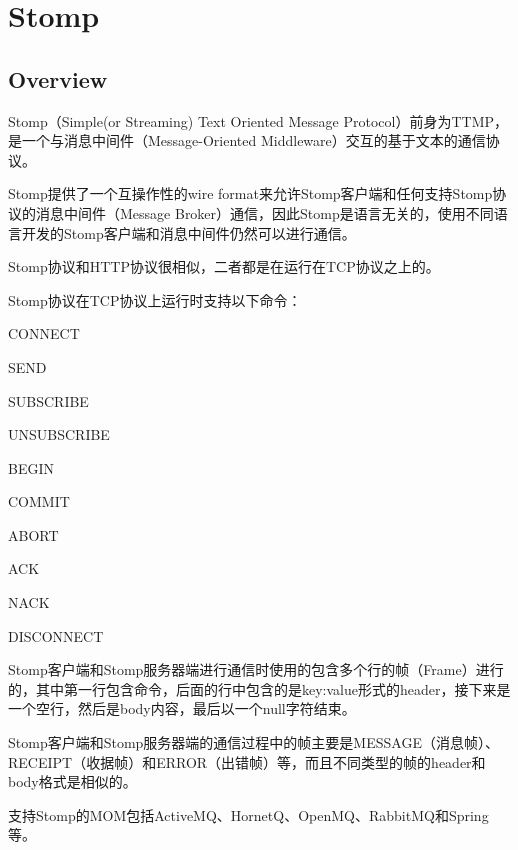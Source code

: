 \part{Stomp}


\chapter{Overview}

Stomp（Simple(or Streaming) Text Oriented Message Protocol）前身为TTMP，是一个与消息中间件（Message-Oriented Middleware）交互的基于文本的通信协议。

Stomp提供了一个互操作性的wire format来允许Stomp客户端和任何支持Stomp协议的消息中间件（Message Broker）通信，因此Stomp是语言无关的，使用不同语言开发的Stomp客户端和消息中间件仍然可以进行通信。

Stomp协议和HTTP协议很相似，二者都是在运行在TCP协议之上的。

Stomp协议在TCP协议上运行时支持以下命令：

\begin{compactitem}
\item CONNECT
\item SEND
\item SUBSCRIBE
\item UNSUBSCRIBE
\item BEGIN
\item COMMIT
\item ABORT
\item ACK
\item NACK
\item DISCONNECT
\end{compactitem}

Stomp客户端和Stomp服务器端进行通信时使用的包含多个行的帧（Frame）进行的，其中第一行包含命令，后面的行中包含的是key:value形式的header，接下来是一个空行，然后是body内容，最后以一个null字符结束。

Stomp客户端和Stomp服务器端的通信过程中的帧主要是MESSAGE（消息帧）、RECEIPT（收据帧）和ERROR（出错帧）等，而且不同类型的帧的header和body格式是相似的。

支持Stomp的MOM包括ActiveMQ、HornetQ、OpenMQ、RabbitMQ和Spring等。


